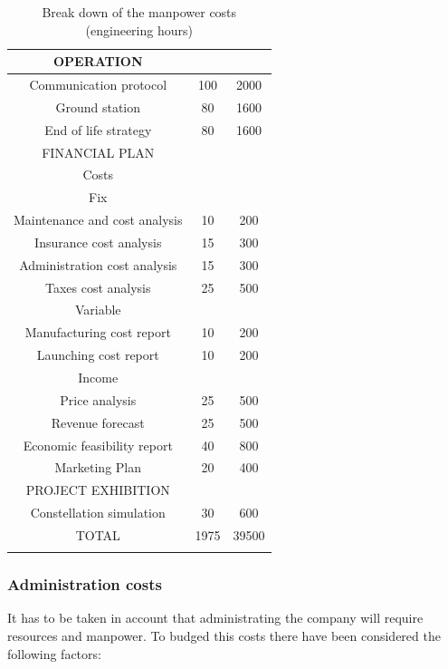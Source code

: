 \begin{longtable}{ccc}
	\rowcolor[gray]{0.85}
	OPERATION &  &  \\ \hline
	Communication protocol & 100 & 2000 \\ \hline
	Ground station & 80 & 1600 \\ \hline
	End of life strategy & 80 & 1600 \\ \hline
	\rowcolor[gray]{0.85}
	FINANCIAL PLAN &  &  \\ \hline
	Costs &  &  \\ \hline
	Fix &  &  \\ \hline
	Maintenance and cost analysis & 10 & 200 \\ \hline
	Insurance cost analysis & 15 & 300 \\ \hline
	Administration cost analysis & 15 & 300 \\ \hline
	Taxes cost analysis & 25 & 500 \\ \hline
	Variable &  &  \\ \hline
	Manufacturing cost report & 10 & 200 \\ \hline
	Launching cost report & 10 & 200 \\ \hline
	Income &  &  \\ \hline
	Price analysis & 25 & 500 \\ \hline
	Revenue forecast & 25 & 500 \\ \hline
	Economic feasibility report & 40 & 800 \\ \hline
	Marketing Plan & 20 & 400 \\ \hline
	\rowcolor[gray]{0.85}
	PROJECT EXHIBITION &  &  \\ \hline
	Constellation simulation & 30 & 600 \\ \hline
	\rowcolor[gray]{0.65}
	TOTAL & 1975 & 39500 \\
	\bottomrule
\caption[Engineering Hours]{Break down of the manpower costs (engineering hours)}
\end{longtable}

\subsubsection{Administration costs}
It has to be taken in account that administrating the company will require resources and manpower. To budged this costs there have been considered the following factors:

